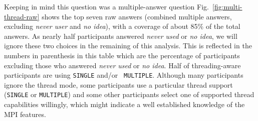 \documentclass[preprint,5p,times]{elsarticle}
\def\myquote#1{{\it #1}}
\newcommand{\revision}[2]{{\color{blue}#2}}
\begin{document}
Keeping in mind this question was a
\revision{multiple-choice}{multiple-answer} question 
\revision{Table~\ref{tab:multi-thread-raw}}{Fig.~\ref{fig:multi-thread-raw}}
shows the top \revision{7}{seven} raw answers
(combined multiple answers\revision{}{, excluding \myquote{never user} and
  \myquote{no idea}}),
with a coverage of about 85\% of the total answers.
As nearly half participants answered \myquote{never used} or \myquote{no idea},
we will ignore these two choices in the remaining of this analysis. This is
reflected in the numbers in parenthesis in this table which are the percentage
of participants excluding those who answered \myquote{never used} or \myquote{no
idea}. Half of threading-aware participants are using {\tt SINGLE} and/or {\tt
MULTIPLE}. Although many participants ignore the thread mode, some participants
use a particular thread support ({\tt SINGLE} or {\tt MULTIPLE}) and some other
participants select one of supported thread capabilities willingly, which might
indicate a well established knowledge of the MPI features.
\end{document}

